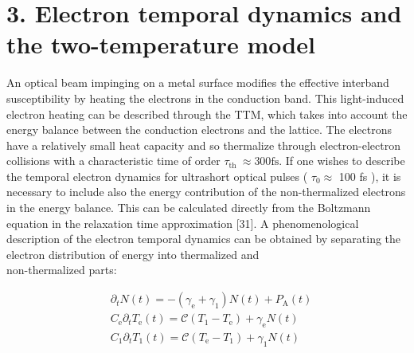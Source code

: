 \documentclass[10pt]{article}
\begin{document}
\section*{3. Electron temporal dynamics and the two-temperature model}
An optical beam impinging on a metal surface modifies the effective interband susceptibility by heating the electrons in the conduction band. This light-induced electron heating can be described through the TTM, which takes into account the energy balance between the conduction electrons and the lattice. The electrons have a relatively small heat capacity and so thermalize through electron-electron collisions with a characteristic time of order $\tau_{\text {th }} \approx 300 \mathrm{fs}$. If one wishes to describe the temporal electron dynamics for ultrashort optical pulses ( $\tau_{0} \approx$ 100 fs ), it is necessary to include also the energy contribution of the non-thermalized electrons in the energy balance. This can be calculated directly from the Boltzmann equation in the relaxation time approximation [31]. A phenomenological description of the electron temporal dynamics can be obtained by separating the electron distribution of energy into thermalized and\\
non-thermalized parts:


\begin{align*}
& \partial_{t} N(t)=-\left(\gamma_{\mathrm{e}}+\gamma_{1}\right) N(t)+P_{\mathrm{A}}(t) \\
& C_{\mathrm{e}} \partial_{t} T_{\mathrm{e}}(t)=\mathcal{C}\left(T_{1}-T_{\mathrm{e}}\right)+\gamma_{\mathrm{e}} N(t)  \tag{7}\\
& C_{1} \partial_{t} T_{1}(t)=\mathcal{C}\left(T_{\mathrm{e}}-T_{1}\right)+\gamma_{1} N(t)
\end{align*}
\end{document}
